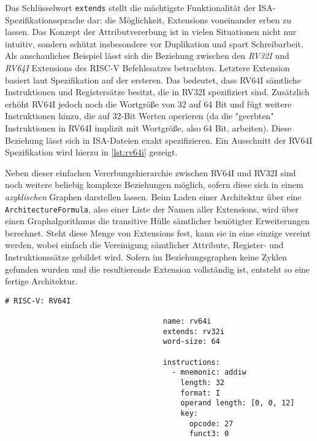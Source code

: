 Das Schlüsselwort \texttt{extends} stellt die mächtigste Funktionalität der
ISA-Spezifikationssprache dar: die Möglichkeit, Extensions voneinander erben zu
lassen. Das Konzept der Attributvererbung ist in vielen Situationen nicht nur
intuitiv, sondern schützt insbesondere vor Duplikation und spart Schreibarbeit.
Als anschauliches Beispiel lässt sich die Beziehung zwischen den \emph{RV32I}
und \emph{RV64I} Extensions des RISC-V Befehlssatzes betrachten. Letztere
Extension basiert laut Spezifikation auf der ersteren. Das bedeutet, dass RV64I
sämtliche Instruktionen und Registersätze besitzt, die in RV32I spezifiziert
sind. Zusätzlich erhöht RV64I jedoch noch die Wortgröße von 32 auf 64 Bit und
fügt weitere Instruktionen hinzu, die auf 32-Bit Werten operieren (da die
"geerbten" Instruktionen in RV64I implizit mit Wortgröße, also 64 Bit,
arbeiten). Diese Beziehung lässt sich in ISA-Dateien exakt spezifizieren. Ein
Ausschnitt der RV64I Spezifikation wird hierzu in \autoref{lst:rv64i} gezeigt.

Neben dieser einfachen Vererbungshierarchie zwischen RV64I und RV32I sind noch
weitere beliebig komplexe Beziehungen möglich, sofern diese sich in einem
\emph{azyklischen} Graphen darstellen lassen. Beim Laden einer Architektur über
eine \texttt{ArchitectureFormula}, also einer Liste der Namen aller Extensions,
wird über einen Graphalgorithmus die transitive Hülle sämtlicher benötigter
Erweiterungen berechnet. Steht diese Menge von Extensions fest, kann sie in eine
einzige vereint werden, wobei einfach die Vereinigung sämtlicher Attribute,
Register- und Instruktionssätze gebildet wird. Sofern im Beziehungsgraphen keine
Zyklen gefunden wurden und die resultierende Extension vollständig ist, entsteht
so eine fertige Architektur.

\begin{table}
\begin{lstlisting}[language=ISA]
                                    # RISC-V: RV64I

                                    name: rv64i
                                    extends: rv32i
                                    word-size: 64

                                    instructions:
                                      - mnemonic: addiw
                                        length: 32
                                        format: I
                                        operand length: [0, 0, 12]
                                        key:
                                          opcode: 27
                                          funct3: 0
\end{lstlisting}
\begin{lstlisting}[caption={Ein Ausschnitt der Definition der RV64I-Extension des RISC-V Befehlssatzes. Zur Vererbung der Attribute von RV32I benötigt es lediglich der Spezifikation der \texttt{extends} Klausel. Zusätzlich wird die Wortgröße sowie eine Hand voll weiterer Befehle neu definiert.}, label={lst:rv64i}]
\end{lstlisting}
\vspace{-0.8cm}
\end{table}

